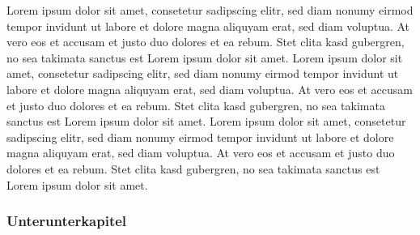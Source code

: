 Lorem ipsum dolor sit amet, consetetur sadipscing elitr, sed diam nonumy eirmod tempor invidunt ut labore et dolore magna aliquyam erat, sed diam voluptua. At vero eos et accusam et justo duo dolores et ea rebum. Stet clita kasd gubergren, no sea takimata sanctus est Lorem ipsum dolor sit amet. Lorem ipsum dolor sit amet, consetetur sadipscing elitr, sed diam nonumy eirmod tempor invidunt ut labore et dolore magna aliquyam erat, sed diam voluptua. At vero eos et accusam et justo duo dolores et ea rebum. Stet clita kasd gubergren, no sea takimata sanctus est Lorem ipsum dolor sit amet. Lorem ipsum dolor sit amet, consetetur sadipscing elitr, sed diam nonumy eirmod tempor invidunt ut labore et dolore magna aliquyam erat, sed diam voluptua. At vero eos et accusam et justo duo dolores et ea rebum. Stet clita kasd gubergren, no sea takimata sanctus est Lorem ipsum dolor sit amet.   

\subsubsection{Unterunterkapitel}
